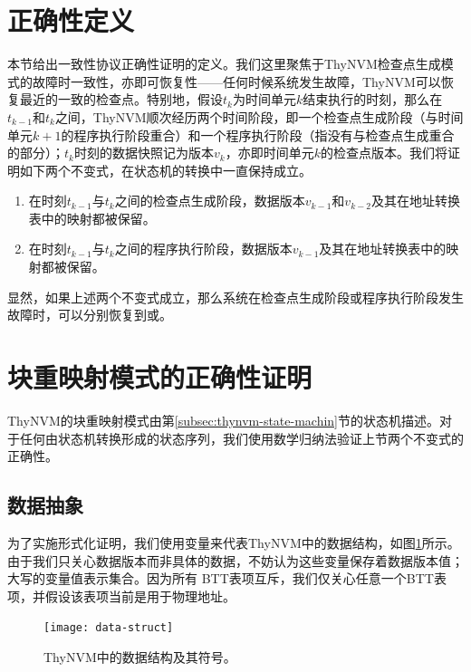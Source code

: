 \section{正确性定义}

本节给出一致性协议正确性证明的定义。我们这里聚焦于ThyNVM检查点生成模式的故障时一致性，亦即可恢复性——任何时候系统发生故障，ThyNVM可以恢复最近的一致的检查点。特别地，假设$t_k$为时间单元$k$结束执行的时刻，那么在$t_{k-1}$和$t_k$之间，ThyNVM顺次经历两个时间阶段，即一个检查点生成阶段（与时间单元$k+1$的程序执行阶段重合）和一个程序执行阶段（指没有与检查点生成重合的部分）；$t_k$时刻的数据快照记为版本$v_k$，亦即时间单元$k$的检查点版本。我们将证明如下两个不变式，在状态机的转换中一直保持成立。

\begin{enumerate}
\item \label{invar-ckpt} 在时刻$t_{k-1}$与$t_k$之间的检查点生成阶段，数据版本$v_{k-1}$和$v_{k-2}$及其在地址转换表中的映射都被保留。
\item \label{invar-exec} 在时刻$t_{k-1}$与$t_k$之间的程序执行阶段，数据版本$v_{k-1}$及其在地址转换表中的映射都被保留。
\end{enumerate}

显然，如果上述两个不变式成立，那么系统在检查点生成阶段或程序执行阶段发生故障时，可以分别恢复到{\cp}或{\cl}。

\section{块重映射模式的正确性证明}

ThyNVM的块重映射模式由第\ref{subsec:thynvm-state-machin}节的状态机描述。对于任何由状态机转换形成的状态序列，我们使用数学归纳法\cite{Hopcroft:ALC:2006}验证上节两个不变式的正确性。

\subsection{数据抽象}

为了实施形式化证明，我们使用变量来代表ThyNVM中的数据结构，如图\ref{fig-data-struct}所示。由于我们只关心数据版本而非具体的数据，不妨认为这些变量保存着数据版本值；大写的变量值表示集合。因为所有 BTT表项互斥，我们仅关心任意一个BTT表项，并假设该表项当前是用于物理地址。

\begin{figure}[!t]
\centering
\texttt{[image: data-struct]}
\caption{ThyNVM中的数据结构及其符号。}
\label{fig-data-struct}
\end{figure}

